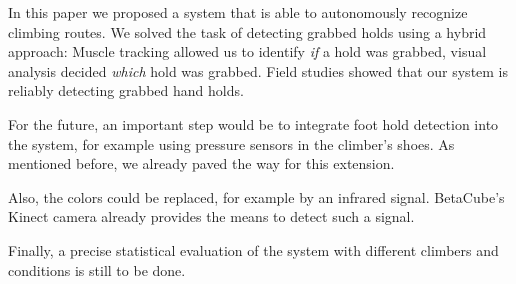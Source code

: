 In this paper we proposed a system that is able to autonomously recognize climbing routes.
We solved the task of detecting grabbed holds using a hybrid approach:
Muscle tracking allowed us to identify \emph{if} a hold was grabbed, visual analysis decided \emph{which} hold was grabbed.
Field studies showed that our system is reliably detecting grabbed hand holds.

For the future, an important step would be to integrate foot hold detection into the system, for example using pressure sensors in the climber's shoes.
As mentioned before, we already paved the way for this extension.

Also, the colors could be replaced, for example by an infrared signal.
BetaCube's Kinect camera already provides the means to detect such a signal.

Finally, a precise statistical evaluation of the system with different climbers and conditions is still to be done.